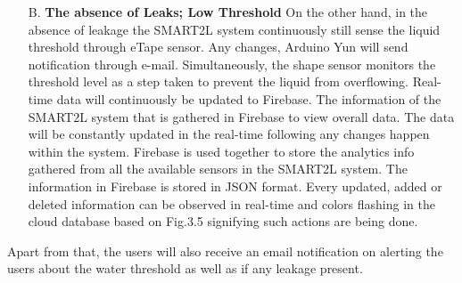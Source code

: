 \documentclass[12pt,times,a4paper]{report}
\begin{document}
{{\begin{normalsize}
\begin{itemize}
\begin{figure}
\end{figure}
\newpage
    \item[B.]\textbf{The absence of Leaks; Low Threshold}
On the other hand, in the absence of leakage                    the SMART2L  system continuously still sense the liquid threshold through eTape sensor. Any changes, Arduino Yun will send notification through e-mail. Simultaneously, the shape sensor monitors the threshold level as a step taken to prevent the liquid from overflowing. Real-time data will continuously be updated to Firebase.
The information of the SMART2L system that is gathered in Firebase to view overall data. The data will be constantly updated in the real-time following any changes happen within the system. Firebase is used together to store the analytics info gathered from all the available sensors in the SMART2L system. The information in Firebase is stored in JSON format. Every updated, added or deleted information can be observed in real-time and colors flashing in the cloud database based on Fig.3.5 signifying such actions are being done. 
\begin{figure}
\begin{center}
\caption{}
\end{center}
\end{figure}
\end{itemize}
\par
Apart from that, the users will also receive an email notification on alerting the users about the water threshold as well as if any leakage present.
\begin{figure}
\begin{center}

\end{center}
\end{figure}
\end{normalsize}}}
\end{document}
